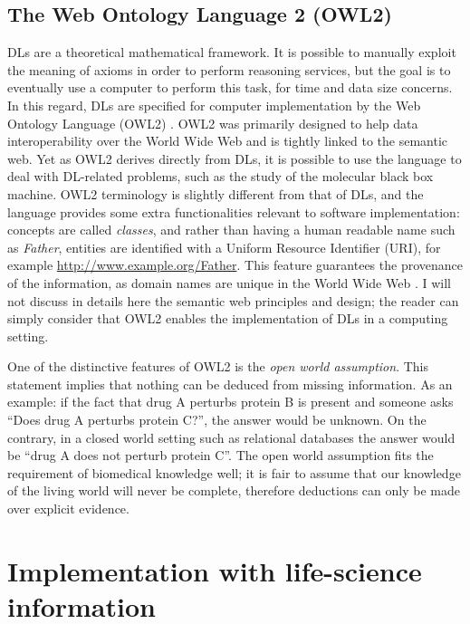\subsection{The Web Ontology Language 2 (OWL2)}
DLs are a theoretical mathematical framework. It is possible to manually exploit the meaning of axioms in order to perform reasoning services, but the goal is to eventually use a computer to perform this task, for time and data size concerns. In this regard, DLs are specified for computer implementation by the Web Ontology Language (OWL2) \citep{owlw3c}. OWL2 was primarily designed to help data interoperability over the World Wide Web and is tightly linked to the semantic web. Yet as OWL2 derives directly from DLs, it is possible to use the language to deal with DL-related problems, such as the study of the molecular black box machine. OWL2 terminology is slightly different from that of DLs, and the language provides some extra functionalities relevant to software implementation: concepts are called \emph{classes}, and rather than having a human readable name such as \emph{Father}, entities are identified with a Uniform Resource Identifier (URI), for example \url{http://www.example.org/Father}. This feature guarantees the provenance of the information, as domain names are unique in the World Wide Web \citep{berners2001semantic}. I will not discuss in details here the semantic web principles and design; the reader can simply consider that OWL2 enables the implementation of DLs in a computing setting.

One of the distinctive features of OWL2 is the \emph{open world assumption}. This statement implies that nothing can be deduced from missing information. As an example: if the fact that drug A perturbs protein B is present and someone asks ``Does drug A perturbs protein C?'', the answer would be unknown. On the contrary, in a closed world setting such as relational databases the answer would be ``drug A does not perturb protein C''. The open world assumption fits the requirement of biomedical knowledge well; it is fair to assume that our knowledge of the living world will never be complete, therefore deductions can only be made over explicit evidence.

\section{Implementation with life-science information}

